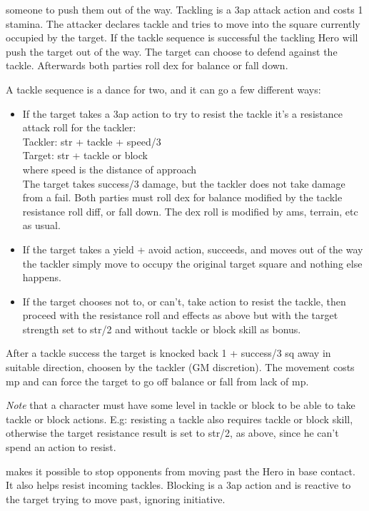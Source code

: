  someone to push them out of the way. Tackling is a 3ap attack action and costs 1 stamina. The attacker declares tackle and tries to move into the square currently occupied by the target. If the tackle sequence is successful the tackling Hero will push the target out of the way.
The target can choose to defend against the tackle. Afterwards both parties roll dex for balance or fall down.

A tackle sequence is a dance for two, and it can go a few different ways:
\begin{itemize}
    \item If the target takes a 3ap action to try to resist the tackle it's a resistance attack roll for the tackler:\\
    Tackler: str + tackle + speed/3 \\ 
    Target: str + tackle or block \\
    where speed is the distance of approach \\
    The target takes success/3 damage, but the tackler does not take damage from a fail. Both parties must roll dex for balance modified by the tackle resistance roll diff, or fall down. The dex roll is modified by ams, terrain, etc as usual.
    \item If the target takes a yield + avoid action, succeeds, and moves out of the way the tackler simply move to occupy the original target square and nothing else happens.
    \item If the target chooses not to, or can't, take action to resist the tackle, then proceed with the resistance roll and effects as above but with the target strength set to str/2 and without tackle or block skill as bonus.
\end{itemize}
After a tackle success the target is knocked back 1 + success/3 sq away in suitable direction, choosen by the tackler (GM discretion). The movement costs mp and can force the target to go off balance or fall from lack of mp.

\emph{Note} that a character must have some level in tackle or block to be able to take tackle or block actions. E.g: resisting a tackle also requires tackle or block skill, otherwise the target resistance result is set to str/2, as above, since he can't spend an action to resist.


 makes it possible to stop opponents from moving past the Hero in base contact. It also helps resist incoming tackles. Blocking is a 3ap action and is reactive to the target trying to move past, ignoring initiative.

